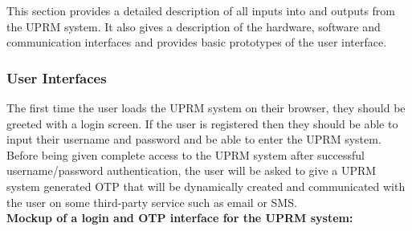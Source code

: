 This section provides a detailed description of all inputs into and outputs from the UPRM system. It also gives a description of the hardware, software and communication interfaces and provides basic prototypes of the user interface.

\subsubsection{User Interfaces}
	The first time the user loads the UPRM system on their browser, they should be greeted with a login screen. If the user is registered then they should be able to input their username and password and be able to enter the UPRM system. Before being given complete access to the UPRM system after successful username/password authentication, the user will be asked to give a UPRM system generated OTP that will be dynamically created and communicated with the user on some third-party service such as email or SMS.\\
	
	\textbf{Mockup of a login and OTP interface for the UPRM system: }\\
	\centerline{}\\ \\
	\centerline{}\\
	
